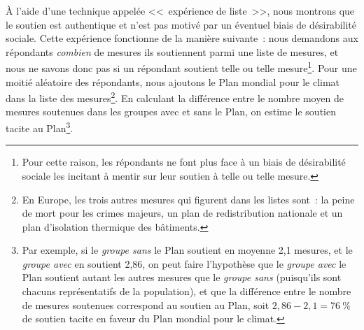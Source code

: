 \documentclass[a5paper,french,openany]{memoir}
\begin{document}
À l'aide d'une technique appelée <<~expérience de liste~>>, nous montrons que le soutien est authentique et n'est pas motivé par un éventuel biais de désirabilité sociale. Cette expérience fonctionne de la manière suivante~: nous demandons aux répondants \textit{combien} de mesures ils soutiennent parmi une liste de mesures, et nous ne savons donc pas si un répondant soutient telle ou telle mesure\footnote{Pour cette raison, les répondants ne font plus face à un biais de désirabilité sociale les incitant à mentir sur leur soutien à telle ou telle mesure.}. 
Pour une moitié aléatoire des répondants, nous ajoutons le Plan mondial pour le climat dans la liste des mesures\footnote{En Europe, les trois autres mesures qui figurent dans les listes sont~: la peine de mort pour les crimes majeurs, un plan de redistribution nationale et un plan d'isolation thermique des bâtiments.}. 
En calculant la différence entre le nombre moyen de mesures soutenues dans les groupes avec et sans le Plan, on estime le soutien tacite au Plan\footnote{Par exemple, si le \textit{groupe sans} le Plan soutient en moyenne 2,1 mesures, et le \textit{groupe avec} en soutient 2,86, on peut faire l'hypothèse que le \textit{groupe avec} le Plan soutient autant les autres mesures que le \textit{groupe sans} (puisqu'ils sont chacuns représentatifs de la population), et que la différence entre le nombre de mesures soutenues correspond au soutien au Plan, soit $2,86 - 2,1 = 76~\%$ de soutien tacite en faveur du Plan mondial pour le climat.}. %
\end{document}
